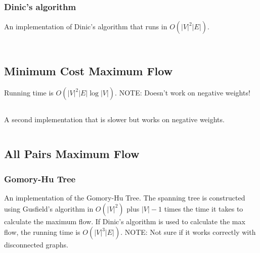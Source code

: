 \documentclass[9pt,a4paper,twocolumn,landscape,oneside]{amsart}
\newcommand{\code}[1]{\inputminted{cpp}{_code/#1}}
\newif\ifverbose
\begin{document}
        \subsubsection{Dinic's algorithm}
            An implementation of Dinic's algorithm that runs in
            $O(|V|^2|E|)$.
            \ifverbose
            It computes the maximum flow of a flow network.
            \fi
            \code{graph/dinic.cpp}

        \ifverbose
        \subsubsection{Edmonds Karp's algorithm}
            An implementation of Edmonds Karp's algorithm that runs in
            $O(|V||E|^2)$.
            \ifverbose
            It computes the maximum flow of a flow network.
            \fi
            \code{graph/edmonds_karps.cpp}
        \fi

    \subsection{Minimum Cost Maximum Flow}
        \ifverbose
        An implementation of Edmonds Karp's algorithm, modified to find
        shortest path to augment each time (instead of just any path). It
        computes the maximum flow of a flow network, and when there are
        multiple maximum flows, finds the maximum flow with minimum cost.
        \fi
        Running time is $O(|V|^2|E|\log|V|)$. NOTE: Doesn't work on negative
        weights!
        \code{graph/edmonds_karps_mcmf.cpp}

        A second implementation that is slower but works on negative weights.
        \code{graph/mcmf_old.cpp}

    \subsection{All Pairs Maximum Flow}
        \subsubsection{Gomory-Hu Tree}
        An implementation of the Gomory-Hu Tree. The spanning tree is constructed using Gusfield's algorithm
        in $O(|V| ^ 2)$ plus $|V|-1$ times the time it takes to calculate the maximum flow.
        If Dinic's algorithm is used to calculate the max flow, the running time is $O(|V|^3|E|)$.
        NOTE: Not sure if it works correctly with disconnected graphs.
        \code{graph/gomory_hu_tree.cpp}
\end{document}
